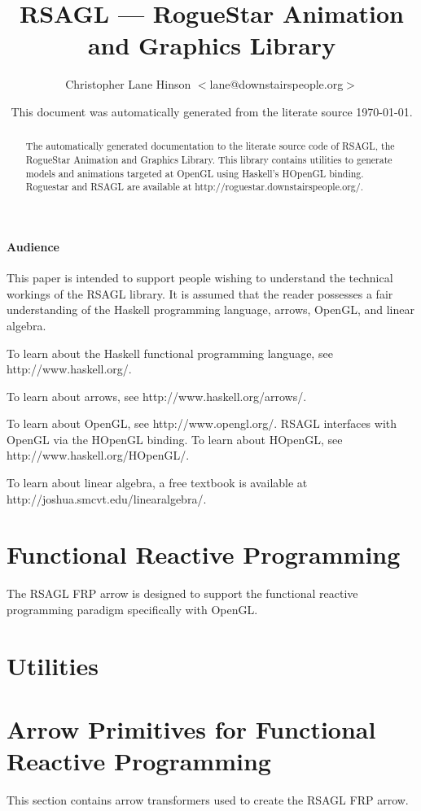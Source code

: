 \documentclass{article}
\author{Christopher Lane Hinson $<$lane@downstairspeople.org$>$}
\title{ RSAGL --- RogueStar Animation and Graphics Library }
\date{ This document was automatically generated from the literate source \today. }
\begin{document}
\maketitle

\begin{abstract}
The automatically generated documentation to the literate source code of RSAGL, 
the RogueStar Animation and Graphics Library.  This library contains utilities
to generate models and animations targeted at OpenGL using Haskell's HOpenGL
binding.  Roguestar and RSAGL are available at http://roguestar.downstairspeople.org/.
\end{abstract}

\tableofcontents

\subsection{Audience}

This paper is intended to support people wishing to understand the technical workings of
the RSAGL library.  It is assumed that the reader possesses a fair understanding
of the Haskell programming language, arrows, OpenGL, and linear algebra.

To learn about the Haskell functional programming language, see http://www.haskell.org/.

To learn about arrows, see http://www.haskell.org/arrows/.

To learn about OpenGL, see http://www.opengl.org/.  RSAGL interfaces with OpenGL via the
HOpenGL binding.  To learn about HOpenGL, see http://www.haskell.org/HOpenGL/.

To learn about linear algebra, a free textbook is available at http://joshua.smcvt.edu/linearalgebra/.

\part{Functional Reactive Programming}

The RSAGL FRP arrow is designed to support the functional reactive programming paradigm
specifically with OpenGL.



\part{Utilities}



\part{Arrow Primitives for Functional Reactive Programming}

This section contains arrow transformers used to create the RSAGL FRP arrow.





\end{document}
